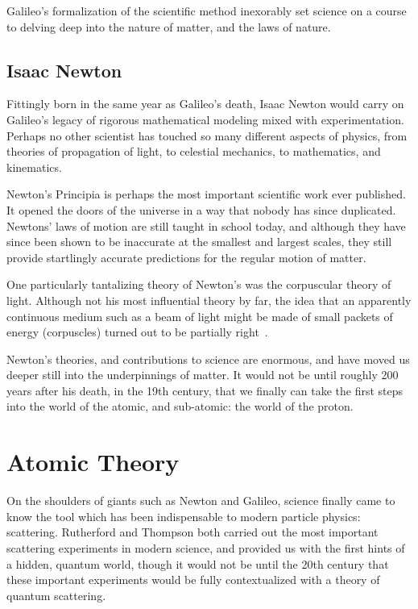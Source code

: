 Galileo's formalization of the scientific method inexorably set science on a
course to delving deep into the nature of matter, and the laws of nature.

\subsection{Isaac Newton}
Fittingly born in the same year as Galileo's death, Isaac Newton would carry on
Galileo's legacy of rigorous mathematical modeling mixed with experimentation.
Perhaps no other scientist has touched so many different aspects of physics,
from theories of propagation of light, to celestial mechanics, to mathematics,
and kinematics.

Newton's Principia is perhaps the most important scientific work ever published.
It opened the doors of the universe in a way that nobody has since duplicated.
Newtons' laws of motion are still taught in school today, and although they have
since been shown to be inaccurate at the smallest and largest scales, they still
provide startlingly accurate predictions for the regular motion of matter.

One particularly tantalizing theory of Newton's was the corpuscular theory of
light. Although not his most influential theory by far, the idea that an
apparently continuous medium such as a beam of light might be made of small
packets of energy (corpuscles) turned out to be partially
right~\cite{Stuewer1970}.

Newton's theories, and contributions to science are enormous, and have moved us
deeper still into the underpinnings of matter. It would not be until roughly 200
years after his death, in the 19th century, that we finally can take the first
steps into the world of the atomic, and sub-atomic: the world of the proton. 

\clearpage
\section{Atomic Theory}

On the shoulders of giants such as Newton and Galileo, science finally came to
know the tool which has been indispensable to modern particle physics:
scattering. Rutherford and Thompson both carried out the most important
scattering experiments in modern science, and provided us with the first hints
of a hidden, quantum world, though it would not be until the 20th century that
these important experiments would be fully contextualized with a theory of
quantum scattering.

